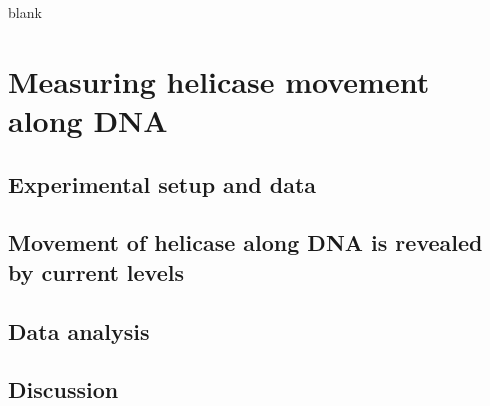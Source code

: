 \begin{savequote}[75mm]
blank
\end{savequote}

\chapter{Measuring helicase movement along DNA}
\label{helicase_on_dna}

\section{Experimental setup and data}

\section{Movement of helicase along DNA is revealed by current levels}

\section{Data analysis}

\section{Discussion}